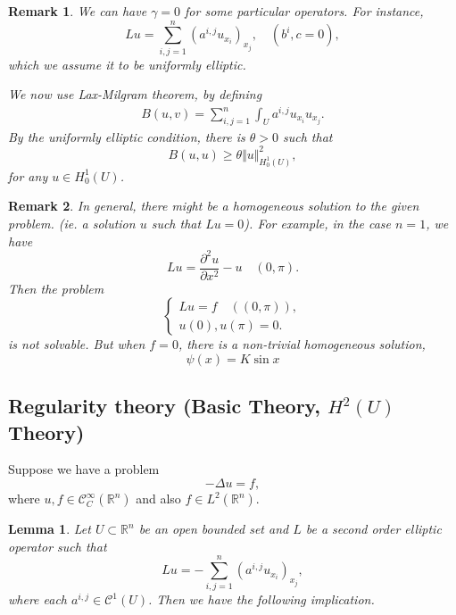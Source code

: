 \documentclass{article}
\newtheorem{lemma}{Lemma}[section]
\newtheorem{remark}{Remark}[section]
\numberwithin{equation}{section}
\begin{document}
\begin{remark}
We can have $\gamma=0$ for some particular operators. For instance, 
\begin{equation*}
Lu=\sum_{i,j=1}^n(a^{i,j}u_{x_i})_{x_j}, \quad (b^i,c=0),
\end{equation*}
which we assume it to be uniformly elliptic.\\
\par We now use Lax-Milgram theorem, by defining
\begin{align*}
B(u,v) = \sum_{i,j=1}^n \int_U a^{i,j}u_{x_i}u_{x_j}.
\end{align*}
By the uniformly elliptic condition, there is $\theta>0$ such that
\begin{equation*}
B(u,u)\geq \theta\Vert u \Vert^2_{H_0^1(U)},
\end{equation*}
for any $u\in H_0^1(U)$.
\end{remark}

\begin{remark}
In general, there might be a homogeneous solution to the given problem. (ie. a solution $u$ such that $Lu=0$). For example, in the case $n=1$, we have
\begin{equation*}
Lu = {\frac {\partial^2u} {\partial x^2}} - u \quad (0,\pi).
\end{equation*}
Then the problem
\begin{equation*}
\begin{cases}
Lu = f \quad ((0,\pi)),\\
u(0),u(\pi)=0.
\end{cases}
\end{equation*}
is not solvable. But when $f=0$, there is a non-trivial homogeneous solution,
\begin{equation*}
\psi(x) = K\sin x
\end{equation*} 
\end{remark}

\subsection{Regularity theory (Basic Theory, $H^2(U)$ Theory)}

Suppose we have a problem
\begin{equation*}
-\Delta u=f,
\end{equation*}
where $u,f\in \mathcal{C}^\infty_C(\mathbb{R}^n)$ and also $f\in L^2(\mathbb{R}^n)$. \\

\begin{lemma}
Let $U\subset\mathbb{R}^n$ be an open bounded set and $L$ be a second order elliptic operator such that
\begin{equation*}
Lu = -\sum_{i,j=1}^n (a^{i,j}u_{x_i})_{x_j},
\end{equation*}
where each $a^{i,j}\in \mathcal{C}^1(U)$. Then we have the following implication.

\end{lemma}
\end{document}

